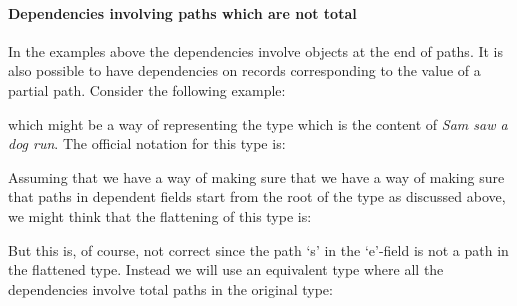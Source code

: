 
\paragraph{Dependencies involving paths which are not total}  
In the examples above the dependencies involve objects at the end of
paths.  It is also possible to have dependencies on records
corresponding to the value of a partial path.  Consider the following
example:
\begin{quote}
\end{quote}
which might be a way of representing the type which is the content of
\textit{Sam saw a dog run}.  The official notation for this type is:
\begin{quote}
\end{quote}
Assuming that we have a way of making sure that we have a way of
making sure that paths in dependent fields start from the root of the
type as discussed above, we might think that the flattening of this type is:
\begin{quote}
\end{quote} 
But this is, of course, not correct since the path `s' in the
`e'-field is not a path in the flattened type.  Instead we will use an
equivalent type where all the dependencies involve total paths in the
original type:


